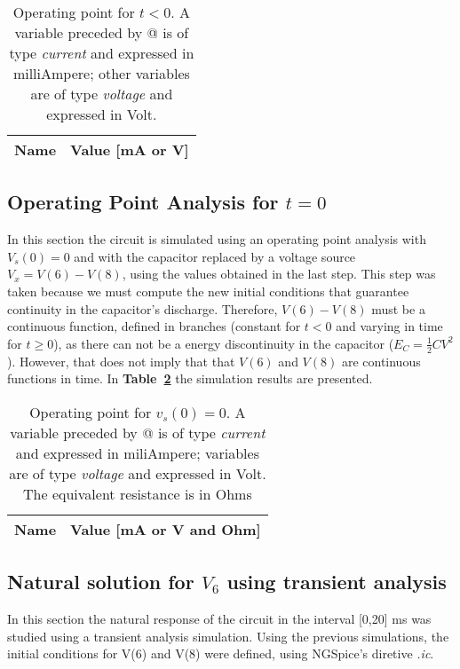 \begin{table}[H]
  \centering
  \begin{tabular}{|l|r|}
    \hline    
    {\bf Name} & {\bf Value [mA or V]} \\ \hline
    
  \end{tabular}
  \caption{Operating point for $t<0$. A variable preceded by @ is of type {\em current}
    and expressed in milliAmpere; other variables are of type {\it voltage} and expressed in
    Volt.}
  \label{tab:op} 
\end{table}


\subsection{Operating Point Analysis for $t=0$}
In this section the circuit is simulated using an operating point analysis with $V_s(0) = 0$ and with the capacitor replaced by a voltage source {\it $V_x=V(6)-V(8)$}, using the values obtained in the last step. This step was taken because we must compute the new initial conditions that guarantee continuity in the capacitor's discharge. Therefore, $V(6) - V(8)$ must be a continuous function, defined in branches (constant for $t<0$ and varying in time for $t \geq 0$), as there can not be a energy discontinuity in the capacitor ($E_C=\frac{1}{2}CV^{2}$). However, that does not imply that that $V(6)$ and $V(8)$ are continuous functions in time.
In \textbf{Table~\ref{tab:opeq}} the simulation results are presented. 
\begin{table}[h!]
  \centering
  \begin{tabular}{|l|r|}
    \hline    
    {\bf Name} & {\bf Value [mA or V and Ohm]} \\ \hline
    
  \end{tabular} 
  \caption{Operating point for {\it $v_s(0)=0$}. A variable preceded by @ is of type {\em current}
    and expressed in miliAmpere; variables are of type {\it voltage} and expressed in
    Volt. The equivalent resistance is in Ohms}
  \label{tab:opeq}
\end{table}
\newpage

 \vspace{3cm}
\subsection{ Natural solution for $V_6$ using transient analysis}
In this section the natural response of the circuit in the interval [0,20] ms was studied using a transient analysis simulation. Using the previous simulations, the initial conditions for V(6) and V(8) were defined, using NGSpice's diretive \textit{.ic}.
\par
\vspace{1cm}
\newpage

